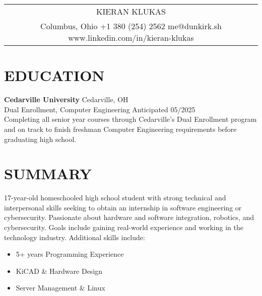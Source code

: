 \documentclass[a4paper,10pt]{article}
\begin{document}
\pagestyle{empty}



\begin{tabularx}{\linewidth}{@{} C @{}}
\Huge{KIERAN KLUKAS} \\[7.5pt]
Columbus, Ohio \textbar{} +1 380 (254) 2562 \textbar{} me@dunkirk.sh \textbar{} www.linkedin.com/in/kieran-klukas
\end{tabularx}

\section{EDUCATION}

\textbf{Cedarville University} \hfill Cedarville, OH\\
Dual Enrollment, Computer Engineering \hfill Anticipated 05/2025\\
Completing all senior year courses through Cedarville's Dual Enrollment program and on track to finish freshman Computer Engineering requirements before graduating high school.


\section{SUMMARY}
17-year-old homeschooled high school student with strong technical and interpersonal skills seeking to obtain an internship in software engineering or cybersecurity. Passionate about hardware and software integration, robotics, and cybersecurity. Goals include gaining real-world experience and working in the technology industry. Additional skills include:
\begin{itemize}[nosep,leftmargin=1em, itemsep=3pt,label=$\bullet$]
\item 5+ years Programming Experience
\item KiCAD \& Hardware Design
\item Server Management \& Linux
\end{itemize}
\end{document}
